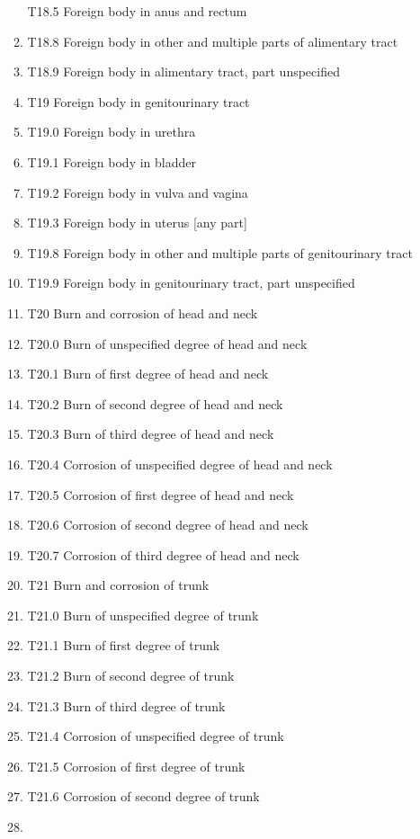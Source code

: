 \documentclass[
]{scrartcl}
\begin{document}
\begin{itemize}
\begin{enumerate}
    T18.5 Foreign body in anus and rectum
  \item
    T18.8 Foreign body in other and multiple parts of alimentary tract
  \item
    T18.9 Foreign body in alimentary tract, part unspecified
  \item
    T19 Foreign body in genitourinary tract
  \item
    T19.0 Foreign body in urethra
  \item
    T19.1 Foreign body in bladder
  \item
    T19.2 Foreign body in vulva and vagina
  \item
    T19.3 Foreign body in uterus {[}any part{]}
  \item
    T19.8 Foreign body in other and multiple parts of genitourinary
    tract
  \item
    T19.9 Foreign body in genitourinary tract, part unspecified
  \item
    T20 Burn and corrosion of head and neck
  \item
    T20.0 Burn of unspecified degree of head and neck
  \item
    T20.1 Burn of first degree of head and neck
  \item
    T20.2 Burn of second degree of head and neck
  \item
    T20.3 Burn of third degree of head and neck
  \item
    T20.4 Corrosion of unspecified degree of head and neck
  \item
    T20.5 Corrosion of first degree of head and neck
  \item
    T20.6 Corrosion of second degree of head and neck
  \item
    T20.7 Corrosion of third degree of head and neck
  \item
    T21 Burn and corrosion of trunk
  \item
    T21.0 Burn of unspecified degree of trunk
  \item
    T21.1 Burn of first degree of trunk
  \item
    T21.2 Burn of second degree of trunk
  \item
    T21.3 Burn of third degree of trunk
  \item
    T21.4 Corrosion of unspecified degree of trunk
  \item
    T21.5 Corrosion of first degree of trunk
  \item
    T21.6 Corrosion of second degree of trunk
  \item

\end{enumerate}
\end{itemize}
\end{document}
